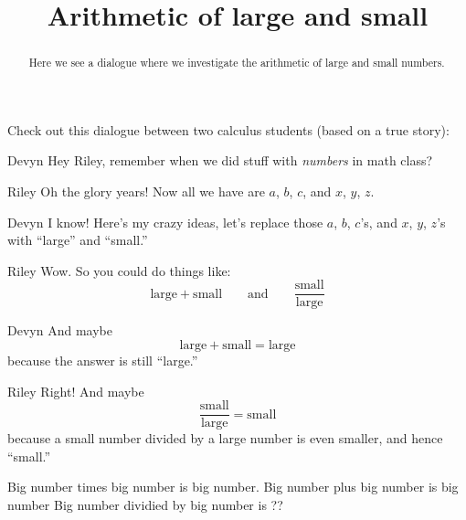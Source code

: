 \documentclass{ximera}
\title[Break-Ground:]{Arithmetic of large and small}
\begin{document}
\begin{abstract}
Here we see a dialogue where we investigate the arithmetic of large and small numbers.
\end{abstract}
\maketitle


Check out this dialogue between two calculus students (based on a true
story):

\begin{dialogue}
\item[Devyn] Hey Riley, remember when we did stuff with
  \textit{numbers} in math class?
\item[Riley] Oh the glory years! Now all we have are $a$, $b$, $c$, and $x$, $y$, $z$.
\item[Devyn] I know! Here's my crazy ideas, let's replace those  $a$, $b$, $c$'s, and $x$, $y$, $z$'s with ``large'' and ``small.''
\item[Riley] Wow. So you could do things like:
  \[
  \text{large}+\text{small}\qquad\text{and}\qquad \frac{\text{small}}{\text{large}}
  \]
\end{dialogue}
\item[Devyn] And maybe
  \[
  \text{large}+\text{small} = \text{large}
  \]
  because the answer is still ``large.''
\item[Riley] Right! And maybe
  \[
  \frac{\text{small}}{\text{large}} = \text{small}
  \]
   because a small number divided by a large number is even smaller, and hence ``small.''
  
Big number times big number is big number.
Big number plus big number is big number
Big number dividied by big number is ??
\end{document}
